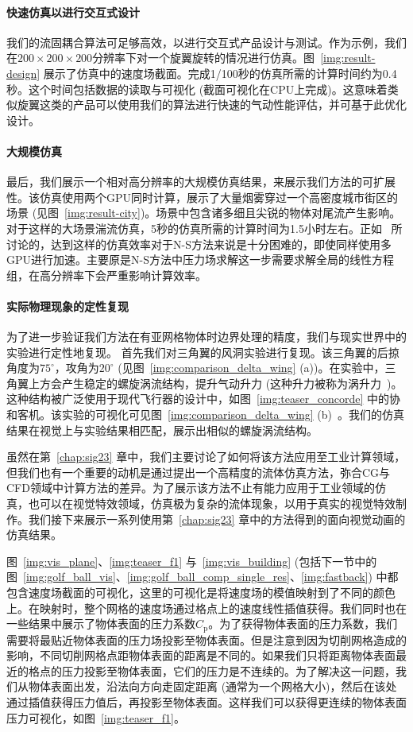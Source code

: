 \paragraph{快速仿真以进行交互式设计}
我们的流固耦合算法可足够高效，以进行交互式产品设计与测试。作为示例，我们在$200\!\times\!200\!\times\!200$分辨率下对一个旋翼旋转的情况进行仿真。图~\ref{img:result-design} 展示了仿真中的速度场截面。完成1/100秒的仿真所需的计算时间约为0.4秒。这个时间包括数据的读取与可视化 (截面可视化在CPU上完成)。这意味着类似旋翼这类的产品可以使用我们的算法进行快速的气动性能评估，并可基于此优化设计。

\paragraph{大规模仿真}
最后，我们展示一个相对高分辨率的大规模仿真结果，来展示我们方法的可扩展性。该仿真使用两个GPU同时计算，展示了大量烟雾穿过一个高密度城市街区的场景 (见图~\ref{img:result-city})。场景中包含诸多细且尖锐的物体对尾流产生影响。对于这样的大场景湍流仿真，5秒的仿真所需的计算时间为1.5小时左右。正如~\citet{Li-2020} 所讨论的，达到这样的仿真效率对于N-S方法来说是十分困难的，即使同样使用多GPU进行加速。主要原是N-S方法中压力场求解这一步需要求解全局的线性方程组，在高分辨率下会严重影响计算效率。

\paragraph{实际物理现象的定性复现}
为了进一步验证我们方法在有亚网格物体时边界处理的精度，我们与现实世界中的实验进行定性地复现。
首先我们对三角翼的风洞实验进行复现。该三角翼的后掠角度为$75^\circ$，攻角为$20^\circ$ (见图~\ref{img:comparison_delta_wing} (a))。在实验中，三角翼上方会产生稳定的螺旋涡流结构，提升气动升力 (这种升力被称为涡升力~\citep{anderson2010aircraft})。这种结构被广泛使用于现代飞行器的设计中，如图~\ref{img:teaser_concorde} 中的协和客机。该实验的可视化可见图~\ref{img:comparison_delta_wing} (b)~\citep{Delery:2001}。我们的仿真结果在视觉上与实验结果相匹配，展示出相似的螺旋涡流结构。

虽然在第~\ref{chap:sig23} 章中，我们主要讨论了如何将该方法应用至工业计算领域，但我们也有一个重要的动机是通过提出一个高精度的流体仿真方法，弥合CG与CFD领域中计算方法的差异。为了展示该方法不止有能力应用于工业领域的仿真，也可以在视觉特效领域，仿真极为复杂的流体现象，以用于真实的视觉特效制作。我们接下来展示一系列使用第~\ref{chap:sig23} 章中的方法得到的面向视觉动画的仿真结果。

图~\ref{img:vis_plane}、\ref{img:teaser_f1} 与~\ref{img:vis_building} (包括下一节中的图~\ref{img:golf_ball_vis}、\ref{img:golf_ball_comp_single_res}、\ref{img:fastback}) 中都包含速度场截面的可视化，这里的可视化是将速度场的模值映射到了不同的颜色上。在映射时，整个网格的速度场通过格点上的速度线性插值获得。我们同时也在一些结果中展示了物体表面的压力系数$C_\text{p}$。为了获得物体表面的压力系数，我们需要将最贴近物体表面的压力场投影至物体表面。但是注意到因为切削网格造成的影响，不同切削网格点距物体表面的距离是不同的。如果我们只将距离物体表面最近的格点的压力投影至物体表面，它们的压力是不连续的。为了解决这一问题，我们从物体表面出发，沿法向方向走固定距离 (通常为一个网格大小)，然后在该处通过插值获得压力值后，再投影至物体表面。这样我们可以获得更连续的物体表面压力可视化，如图~\ref{img:teaser_f1}。

